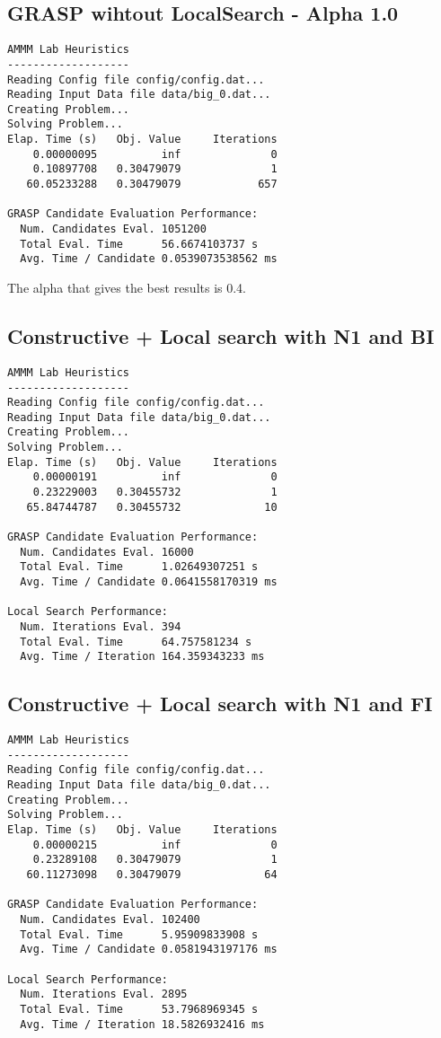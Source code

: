 \documentclass{article}
\begin{document}
\subsection{GRASP wihtout LocalSearch - Alpha 1.0}
\begin{lstlisting}
AMMM Lab Heuristics
-------------------
Reading Config file config/config.dat...
Reading Input Data file data/big_0.dat...
Creating Problem...
Solving Problem...
Elap. Time (s)   Obj. Value     Iterations
    0.00000095          inf              0
    0.10897708   0.30479079              1
   60.05233288   0.30479079            657

GRASP Candidate Evaluation Performance:
  Num. Candidates Eval. 1051200
  Total Eval. Time      56.6674103737 s
  Avg. Time / Candidate 0.0539073538562 ms
\end{lstlisting}

The alpha that gives the best results is 0.4.

\subsection{Constructive + Local search with N1 and BI}
\begin{lstlisting}
AMMM Lab Heuristics
-------------------
Reading Config file config/config.dat...
Reading Input Data file data/big_0.dat...
Creating Problem...
Solving Problem...
Elap. Time (s)   Obj. Value     Iterations
    0.00000191          inf              0
    0.23229003   0.30455732              1
   65.84744787   0.30455732             10

GRASP Candidate Evaluation Performance:
  Num. Candidates Eval. 16000
  Total Eval. Time      1.02649307251 s
  Avg. Time / Candidate 0.0641558170319 ms

Local Search Performance:
  Num. Iterations Eval. 394
  Total Eval. Time      64.757581234 s
  Avg. Time / Iteration 164.359343233 ms
\end{lstlisting}

\subsection{Constructive + Local search with N1 and FI}
\begin{lstlisting}
AMMM Lab Heuristics
-------------------
Reading Config file config/config.dat...
Reading Input Data file data/big_0.dat...
Creating Problem...
Solving Problem...
Elap. Time (s)   Obj. Value     Iterations
    0.00000215          inf              0
    0.23289108   0.30479079              1
   60.11273098   0.30479079             64

GRASP Candidate Evaluation Performance:
  Num. Candidates Eval. 102400
  Total Eval. Time      5.95909833908 s
  Avg. Time / Candidate 0.0581943197176 ms

Local Search Performance:
  Num. Iterations Eval. 2895
  Total Eval. Time      53.7968969345 s
  Avg. Time / Iteration 18.5826932416 ms
\end{lstlisting}
\end{document}
